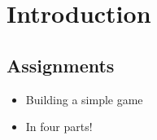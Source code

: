 \section{Introduction}
	\subsection{Assignments}
		\begin{itemize}
			\item Building a simple game
			\item In four parts!
		\end{itemize}

